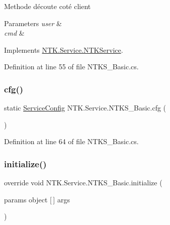 Methode d\textquotesingle{}écoute coté client 


\begin{DoxyParams}{Parameters}
{\em user} & \\
\hline
{\em cmd} & \\
\hline
\end{DoxyParams}


Implements \mbox{\hyperlink{class_n_t_k_1_1_service_1_1_n_t_k_service_a5f591a8d31f2e2b01fc47a17a4102574}{N\+T\+K.\+Service.\+N\+T\+K\+Service}}.



Definition at line 55 of file N\+T\+K\+S\+\_\+\+Basic.\+cs.

\mbox{\label{class_n_t_k_1_1_service_1_1_n_t_k_s___basic_a80bdfb9e67c9ac5c33fbdb8b10953681}} 
\subsubsection{\texorpdfstring{cfg()}{cfg()}}
{\footnotesize\ttfamily static \mbox{\hyperlink{struct_n_t_k_1_1_service_1_1_service_config}{Service\+Config}} N\+T\+K.\+Service.\+N\+T\+K\+S\+\_\+\+Basic.\+cfg (\begin{DoxyParamCaption}{ }\end{DoxyParamCaption})\hspace{0.3cm}{\ttfamily [static]}}



Definition at line 64 of file N\+T\+K\+S\+\_\+\+Basic.\+cs.

\mbox{\label{class_n_t_k_1_1_service_1_1_n_t_k_s___basic_a78fc9f1c34b15912b6c0e015e5ea64d2}} 
\subsubsection{\texorpdfstring{initialize()}{initialize()}}
{\footnotesize\ttfamily override void N\+T\+K.\+Service.\+N\+T\+K\+S\+\_\+\+Basic.\+initialize (\begin{DoxyParamCaption}\item[{params object \mbox{[}$\,$\mbox{]}}]{args }\end{DoxyParamCaption})}



